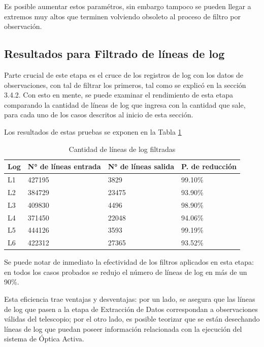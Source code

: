 Es posible aumentar estos paramétros, sin embargo tampoco se pueden llegar a extremos muy altos que terminen volviendo obsoleto al proceso de filtro por observación.

\subsection{Resultados para Filtrado de líneas de log}

Parte crucial de este etapa es el cruce de los registros de log con los datos de observaciones, con tal de filtrar los primeros, tal como se explicó en la sección 3.4.2. Con esto en mente, se puede examinar el rendimiento de esta etapa comparando la cantidad de líneas de log que ingresa con la cantidad que sale, para cada uno de los casos descritos al inicio de esta sección.

Los resultados de estas pruebas se exponen en la Tabla \ref{table:etapa1}


\begin{table}[h]
    \centering
    \caption{\label{table:etapa1} Cantidad de líneas de log filtradas}
    \begin{tabular}{|p{3.5cm}|p{3.5cm}|p{3.5cm}|p{3.5cm}|}
        \hline
        Log & N° de líneas entrada & N° de líneas salida & P. de reducción \\
        \hline
        L1 & 427195 & 3829 & 99.10\% \\
        \hline
        L2 & 384729 & 23475 & 93.90\% \\
        \hline
        L3 & 409830 & 4496 & 98.90\% \\
        \hline
        L4 & 371450 & 22048 & 94.06\% \\
        \hline
        L5 & 444126 & 3593 & 99.19\% \\
        \hline
        L6 & 422312 & 27365 & 93.52\% \\
        \hline
    \end{tabular}
\end{table}

Se puede notar de inmediato la efectividad de los filtros aplicados en esta etapa: en todos los casos probados se redujo el número de líneas de log en más de un 90\%.

Esta eficiencia trae ventajas y desventajas: por un lado, se asegura que las líneas de log que pasen a la etapa de Extracción de Datos correspondan a observaciones válidas del telescopio; por el otro lado, es posible teorizar que se están desechando líneas de log que puedan poseer información relacionada con la ejecución del sistema de Óptica Activa.

